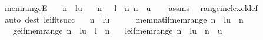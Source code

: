 \begin{isabellebody}
\endisatagproof
{\isafoldproof}%
%
\isadelimproof
\isanewline
%
\endisadelimproof
\isanewline
{}\isamarkupfalse%
\ mem{\isacharunderscore}{\kern0pt}rangeE{\isacharcolon}{\kern0pt}\isanewline
\ \ \ {\isachardoublequoteopen}n\ {\isasymin}\ {\isacharbrackleft}{\kern0pt}l{\isacharcomma}{\kern0pt}{\isasymdots}{\isacharcomma}{\kern0pt}u{\isacharbrackright}{\kern0pt}{\isachardoublequoteclose}\isanewline
\ \ \ {\isachardoublequoteopen}n\ {\isasymin}\ {\isasymnat}{\isachardoublequoteclose}\ {\isachardoublequoteopen}l\ {\isasymle}\ n{\isachardoublequoteclose}\ {\isachardoublequoteopen}n\ {\isasymle}\ u{\isachardoublequoteclose}\isanewline
%
\isadelimproof
\ \ %
\endisadelimproof
%
\isatagproof
{}\isamarkupfalse%
\ assms\ \isamarkupfalse%
\ range{\isacharunderscore}{\kern0pt}incl{\isacharunderscore}{\kern0pt}excl{\isacharunderscore}{\kern0pt}def\ \isamarkupfalse%
\ {\isacharparenleft}{\kern0pt}auto\ dest{\isacharcolon}{\kern0pt}\ le{\isacharunderscore}{\kern0pt}if{\isacharunderscore}{\kern0pt}lt{\isacharunderscore}{\kern0pt}succ{\isacharparenright}{\kern0pt}%
\endisatagproof
{\isafoldproof}%
%
\isadelimproof
\isanewline
%
\endisadelimproof
\isanewline
{}\isamarkupfalse%
\isanewline
\ \ \ {\isachardoublequoteopen}n\ {\isasymin}\ {\isacharbrackleft}{\kern0pt}l{\isacharcomma}{\kern0pt}{\isasymdots}{\isacharcomma}{\kern0pt}u{\isacharbrackright}{\kern0pt}{\isachardoublequoteclose}\isanewline
\ \ \isanewline
\ \ \ mem{\isacharunderscore}{\kern0pt}nat{\isacharunderscore}{\kern0pt}if{\isacharunderscore}{\kern0pt}mem{\isacharunderscore}{\kern0pt}range{\isacharcolon}{\kern0pt}\ {\isachardoublequoteopen}n\ {\isasymin}\ {\isacharbrackleft}{\kern0pt}l{\isacharcomma}{\kern0pt}{\isasymdots}{\isacharcomma}{\kern0pt}u{\isacharbrackright}{\kern0pt}\ {\isasymLongrightarrow}\ n\ {\isasymin}\ {\isasymnat}{\isachardoublequoteclose}\isanewline
\ \ \ ge{\isacharunderscore}{\kern0pt}if{\isacharunderscore}{\kern0pt}mem{\isacharunderscore}{\kern0pt}range{\isacharcolon}{\kern0pt}\ {\isachardoublequoteopen}n\ {\isasymin}\ {\isacharbrackleft}{\kern0pt}l{\isacharcomma}{\kern0pt}{\isasymdots}{\isacharcomma}{\kern0pt}u{\isacharbrackright}{\kern0pt}\ {\isasymLongrightarrow}\ l\ {\isasymle}\ n{\isachardoublequoteclose}\isanewline
\ \ \ le{\isacharunderscore}{\kern0pt}if{\isacharunderscore}{\kern0pt}mem{\isacharunderscore}{\kern0pt}range{\isacharcolon}{\kern0pt}\ {\isachardoublequoteopen}n\ {\isasymin}\ {\isacharbrackleft}{\kern0pt}l{\isacharcomma}{\kern0pt}{\isasymdots}{\isacharcomma}{\kern0pt}u{\isacharbrackright}{\kern0pt}\ {\isasymLongrightarrow}\ n\ {\isasymle}\ u{\isachardoublequoteclose}\isanewline

\end{isabellebody}
